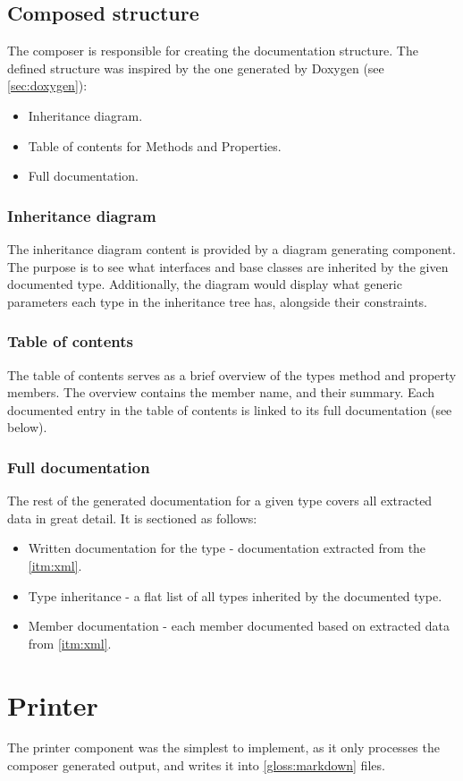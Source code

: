 \subsection{Composed structure}

The composer is responsible for creating the documentation structure. The defined structure was inspired by the one generated by Doxygen (see \ref{sec:doxygen}):
\begin{itemize}
    \item Inheritance diagram.
    \item Table of contents for Methods and Properties.
    \item Full documentation.
\end{itemize}

\subsubsection{Inheritance diagram}

The inheritance diagram content is provided by a diagram generating component. The purpose is to see what interfaces and base classes are inherited by the given documented type. Additionally, the diagram would display what generic parameters each type in the inheritance tree has, alongside their constraints.

\subsubsection{Table of contents}

The table of contents serves as a brief overview of the types method and property members. The overview contains the member name, and their summary. Each documented entry in the table of contents is linked to its full documentation (see below).

\subsubsection{Full documentation}

The rest of the generated documentation for a given type covers all extracted data in great detail. It is sectioned as follows:
\begin{itemize}
    \item Written documentation for the type - documentation extracted from the \ref{itm:xml}.
    \item Type inheritance - a flat list of all types inherited by the documented type.
    \item Member documentation - each member documented based on extracted data from \ref{itm:xml}.
\end{itemize}

\section{Printer}

The printer component was the simplest to implement, as it only processes the composer generated output, and writes it into \ref{gloss:markdown} files.